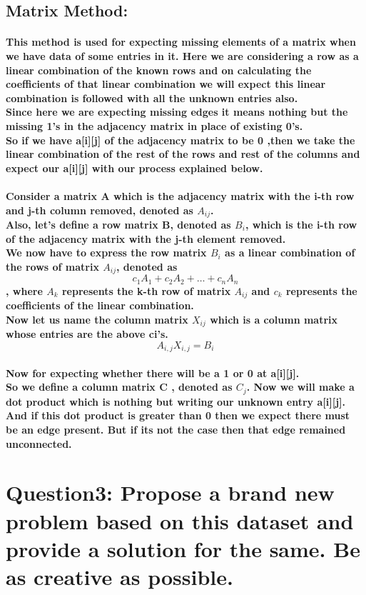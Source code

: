\documentclass{article}
\begin{document}
\subsection*{Matrix Method:}
\paragraph{This method is used for expecting missing elements of a matrix when we have data of some entries in it. Here we are considering a row as a linear combination of the known rows and on calculating the coefficients of that linear combination we will expect this linear combination is followed with all the unknown entries also.\\Since here we are expecting missing edges it means nothing but the missing 1's in the adjacency matrix in place of existing 0's.\\So if we have a[i][j] of the adjacency matrix to be 0 ,then we take the linear combination of the rest of the rows and rest of the columns and expect our a[i][j] with our process explained below.}
\paragraph{Consider a matrix A which is the adjacency matrix with the i-th row and j-th column removed, denoted as $A_{ij}$.\\ Also, let's define a row matrix B, denoted as $B_i$, which is the i-th row of the adjacency matrix with the j-th element removed.\\ We now have to express the row matrix $B_i$ as a linear combination of the rows of matrix $A_{ij}$, denoted as $$c_1A_1 + c_2A_2 + \ldots + c_nA_n$$, where $A_k$ represents the k-th row of matrix $A_{ij}$ and $c_k$ represents the coefficients of the linear combination.\\Now let us name the column matrix $X_{ij}$ which is a column matrix whose entries are the above ci's.$$A_{i,j}X_{i,j}=B_{i}$$\\Now for expecting whether there will be a 1 or 0 at a[i][j]. \\ So we define a column matrix C , denoted as $C_j$. Now we will make a dot product which is nothing but writing our unknown entry a[i][j]. And if this dot product is greater than 0 then we expect there must be an edge present. But if its not the case then that edge remained unconnected.}


\section*{Question3: Propose a brand new problem based on this dataset and provide a solution for the same. Be as creative as possible.}
\end{document}
